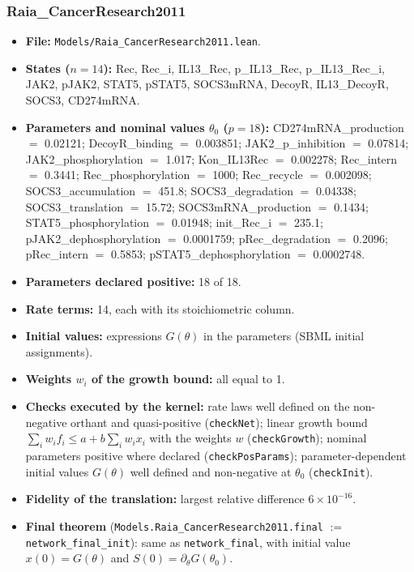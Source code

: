 \subsubsection*{Raia\_CancerResearch2011}

\begin{itemize}\itemsep0pt\small
\item \textbf{File:} \texttt{Models/Raia\_CancerResearch2011.lean}.
\item \textbf{States ($n=14$):} Rec, Rec\_i, IL13\_Rec, p\_IL13\_Rec, p\_IL13\_Rec\_i, JAK2, pJAK2, STAT5, pSTAT5, SOCS3mRNA, DecoyR, IL13\_DecoyR, SOCS3, CD274mRNA.
\item \textbf{Parameters and nominal values $\theta_0$ ($p=18$):} CD274mRNA\_production $=$ 0.02121; DecoyR\_binding $=$ 0.003851; JAK2\_p\_inhibition $=$ 0.07814; JAK2\_phosphorylation $=$ 1.017; Kon\_IL13Rec $=$ 0.002278; Rec\_intern $=$ 0.3441; Rec\_phosphorylation $=$ 1000; Rec\_recycle $=$ 0.002098; SOCS3\_accumulation $=$ 451.8; SOCS3\_degradation $=$ 0.04338; SOCS3\_translation $=$ 15.72; SOCS3mRNA\_production $=$ 0.1434; STAT5\_phosphorylation $=$ 0.01948; init\_Rec\_i $=$ 235.1; pJAK2\_dephosphorylation $=$ 0.0001759; pRec\_degradation $=$ 0.2096; pRec\_intern $=$ 0.5853; pSTAT5\_dephosphorylation $=$ 0.0002748.
\item \textbf{Parameters declared positive:} 18 of 18.
\item \textbf{Rate terms:} 14, each with its stoichiometric column.
\item \textbf{Initial values:} expressions $G(\theta)$ in the parameters (SBML initial assignments).
\item \textbf{Weights $w_i$ of the growth bound:} all equal to 1.
\item \textbf{Checks executed by the kernel:} rate laws well defined on the non-negative orthant and quasi-positive (\texttt{checkNet}); linear growth bound $\sum_iw_if_i\le a+b\sum_iw_ix_i$ with the weights $w$ (\texttt{checkGrowth}); nominal parameters positive where declared (\texttt{checkPosParams}); parameter-dependent initial values $G(\theta)$ well defined and non-negative at $\theta_0$ (\texttt{checkInit}).
\item \textbf{Fidelity of the translation:} largest relative difference $6\times10^{-16}$.
\item \textbf{Final theorem} (\texttt{Models.Raia\_CancerResearch2011.final} $:=$ \texttt{network\_final\_init}): same as \texttt{network\_final}, with initial value $x(0)=G(\theta)$ and $S(0)=\partial_\theta G(\theta_0)$.
\end{itemize}

